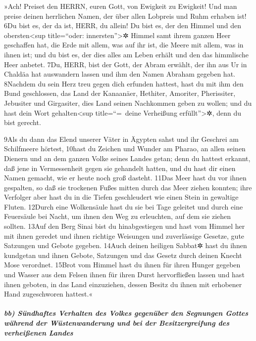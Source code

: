 »Ach! Preiset den HERRN, euren Gott, von Ewigkeit zu Ewigkeit! Und man
preise deinen herrlichen Namen, der über allen Lobpreis und Ruhm erhaben
ist! 6Du bist es, der da ist, HERR, du allein! Du bist es, der den
Himmel und den obersten\textless sup title=``oder:
innersten''\textgreater✲ Himmel samt ihrem ganzen Heer geschaffen hat,
die Erde mit allem, was auf ihr ist, die Meere mit allem, was in ihnen
ist; und du bist es, der dies alles am Leben erhält und den das
himmlische Heer anbetet. 7Du, HERR, bist der Gott, der Abram erwählt,
der ihn aus Ur in Chaldäa hat auswandern lassen und ihm den Namen
Abraham gegeben hat. 8Nachdem du sein Herz treu gegen dich erfunden
hattest, hast du mit ihm den Bund geschlossen, das Land der Kanaanäer,
Hethiter, Amoriter, Pherissiter, Jebusiter und Girgasiter, dies Land
seinen Nachkommen geben zu wollen; und du hast dein Wort
gehalten\textless sup title=``=~deine Verheißung erfüllt''\textgreater✲,
denn du bist gerecht.

9Als du dann das Elend unserer Väter in Ägypten sahst und ihr Geschrei
am Schilfmeere hörtest, 10hast du Zeichen und Wunder am Pharao, an allen
seinen Dienern und an dem ganzen Volke seines Landes getan; denn du
hattest erkannt, daß jene in Vermessenheit gegen sie gehandelt hatten,
und du hast dir einen Namen gemacht, wie er heute noch groß dasteht.
11Das Meer hast du vor ihnen gespalten, so daß sie trockenen Fußes
mitten durch das Meer ziehen konnten; ihre Verfolger aber hast du in die
Tiefen geschleudert wie einen Stein in gewaltige Fluten. 12Durch eine
Wolkensäule hast du sie bei Tage geleitet und durch eine Feuersäule bei
Nacht, um ihnen den Weg zu erleuchten, auf dem sie ziehen sollten. 13Auf
den Berg Sinai bist du hinabgestiegen und hast vom Himmel her mit ihnen
geredet und ihnen richtige Weisungen und zuverlässige Gesetze, gute
Satzungen und Gebote gegeben. 14Auch deinen heiligen Sabbat✲ hast du
ihnen kundgetan und ihnen Gebote, Satzungen und das Gesetz durch deinen
Knecht Mose verordnet. 15Brot vom Himmel hast du ihnen für ihren Hunger
gegeben und Wasser aus dem Felsen ihnen für ihren Durst hervorfließen
lassen und hast ihnen geboten, in das Land einzuziehen, dessen Besitz du
ihnen mit erhobener Hand zugeschworen hattest.«

\hypertarget{bb-suxfcndhaftes-verhalten-des-volkes-gegenuxfcber-den-segnungen-gottes-wuxe4hrend-der-wuxfcstenwanderung-und-bei-der-besitzergreifung-des-verheiuxdfenen-landes}{%
\subparagraph{bb) Sündhaftes Verhalten des Volkes gegenüber den
Segnungen Gottes während der Wüstenwanderung und bei der
Besitzergreifung des verheißenen
Landes}\label{bb-suxfcndhaftes-verhalten-des-volkes-gegenuxfcber-den-segnungen-gottes-wuxe4hrend-der-wuxfcstenwanderung-und-bei-der-besitzergreifung-des-verheiuxdfenen-landes}}

